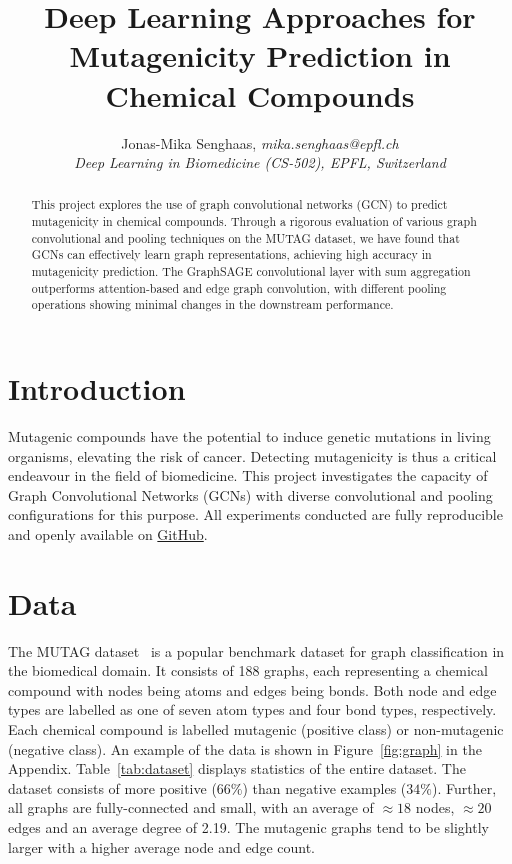 \documentclass[10pt,conference,compsocconf]{IEEEtran}
\begin{document}
\title{Deep Learning Approaches for Mutagenicity Prediction in Chemical Compounds}

\author{
  Jonas-Mika Senghaas, \textit{mika.senghaas@epfl.ch} \\
  \textit{Deep Learning in Biomedicine (CS-502), EPFL, Switzerland}
}

\maketitle

\begin{abstract}

This project explores the use of graph convolutional networks (GCN) to predict
mutagenicity in chemical compounds. Through a rigorous evaluation of various
graph convolutional and pooling techniques on the MUTAG dataset, we have found
that GCNs can effectively learn graph representations, achieving high accuracy
in mutagenicity prediction. The GraphSAGE convolutional layer with sum
aggregation outperforms attention-based and edge graph convolution, with
different pooling operations showing minimal changes in the downstream
performance.

\end{abstract}


\section{Introduction}

Mutagenic compounds have the potential to induce genetic mutations in living
organisms, elevating the risk of cancer. Detecting mutagenicity is thus a
critical endeavour in the field of biomedicine. This project investigates the
capacity of Graph Convolutional Networks (GCNs) with diverse convolutional and
pooling configurations for this purpose. All experiments conducted are fully
reproducible and openly available on
\href{https://github.com/mikasenghaas/cs502}{GitHub}.

\section{Data}

The MUTAG dataset~\cite{mutag} is a popular benchmark dataset for graph
classification in the biomedical domain. It consists of 188 graphs, each
representing a chemical compound with nodes being atoms and edges being bonds.
Both node and edge types are labelled as one of seven atom types and four bond
types, respectively. Each chemical compound is labelled mutagenic (positive
class) or non-mutagenic (negative class). An example of the data is shown in
Figure~\ref{fig:graph} in the Appendix. Table~\ref{tab:dataset} displays
statistics of the entire dataset. The dataset consists of more positive ($66\%$)
than negative examples ($34\%$). Further, all graphs are fully-connected and
small, with an average of $\approx 18$ nodes, $\approx 20$ edges and an average
degree of 2.19. The mutagenic graphs tend to be slightly larger with a higher
average node and edge count. 
\end{document}
